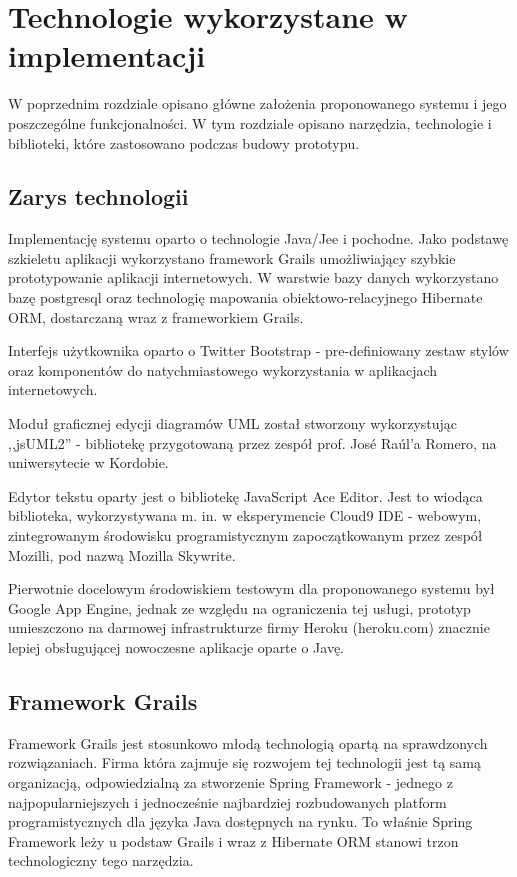 \chapter{Technologie wykorzystane w implementacji}
  
  W poprzednim rozdziale opisano główne założenia proponowanego systemu i jego poszczególne funkcjonalności. W tym rozdziale opisano narzędzia, technologie i biblioteki, które zastosowano podczas budowy prototypu.

  \section{Zarys technologii}
    
    Implementację systemu oparto o technologie Java/Jee i pochodne. Jako podstawę szkieletu aplikacji wykorzystano framework Grails umożliwiający szybkie prototypowanie aplikacji internetowych. W warstwie bazy danych wykorzystano bazę postgresql oraz technologię mapowania obiektowo-relacyjnego Hibernate ORM, dostarczaną wraz z frameworkiem Grails. 
    
    Interfejs użytkownika oparto o Twitter Bootstrap - pre-definiowany zestaw stylów oraz komponentów do natychmiastowego wykorzystania w aplikacjach internetowych. 

    Moduł graficznej edycji diagramów UML został stworzony wykorzystując ,,jsUML2'' - bibliotekę przygotowaną przez zespół prof. José Raúl'a Romero, na uniwersytecie w Kordobie. 

    Edytor tekstu oparty jest o bibliotekę JavaScript Ace Editor. Jest to wiodąca biblioteka, wykorzystywana m. in. w eksperymencie Cloud9 IDE - webowym, zintegrowanym środowisku programistycznym zapoczątkowanym przez zespół Mozilli, pod nazwą Mozilla Skywrite.
  
    Pierwotnie docelowym środowiskiem testowym dla proponowanego systemu był Google App Engine, jednak ze względu na ograniczenia tej usługi, prototyp umieszczono na darmowej infrastrukturze firmy Heroku (heroku.com) znacznie lepiej obsługującej nowoczesne aplikacje oparte o Javę.

  \section{Framework Grails}
    
    Framework Grails jest stosunkowo młodą technologią opartą na sprawdzonych rozwiązaniach. Firma która zajmuje się rozwojem tej technologii jest tą samą organizacją, odpowiedzialną za stworzenie Spring Framework - jednego z najpopularniejszych i jednocześnie najbardziej rozbudowanych platform programistycznych dla języka Java dostępnych na rynku. To właśnie Spring Framework leży u podstaw Grails i wraz z Hibernate ORM stanowi trzon technologiczny tego narzędzia.

